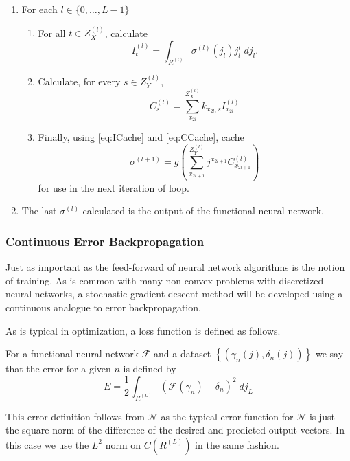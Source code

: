    \begin{enumerate}
    \item  For each $l \in \{0,\dots,L-1\}$
      \begin{enumerate}
      \item For all $t \in Z^{(l)}_X$, calculate
         \begin{equation} \label{eq:ICache} 
            I^{(l)}_t = \int_{R^{(l)}} \sigma^{(l)}(j_l)j_l^{t}\;dj_l.
         \end{equation}

       \item Calculate, for every $s \in Z^{(l)}_Y$,
         \begin{equation} \label{eq:CCache}
            C^{(l)}_{s} = \sum_{x_{2l}}^{Z^{(l)}_X} k_{x_{2l},s} I^{(l)}_{x_{2l}} 
         \end{equation}

        \item Finally, using \eqref{eq:ICache} and \eqref{eq:CCache}, cache 
          \begin{equation}
            \sigma^{(l+1)}=g\left(\sum_{x_{2l+1}}^{Z^{(l)}_Y} j^{x_{2l+1}} C^{(l)}_{x_{2l+1}}\right)
          \end{equation}
          for use in the next iteration of loop.
      \end{enumerate}
      \item The last $\sigma^{(l)}$ calculated is the output of the functional neural network.
    \end{enumerate}











\subsubsection{Continuous Error Backpropagation}

Just as important as the feed-forward of neural network algorithms is the notion of training. As is common with many non-convex problems with discretized neural networks, a stochastic gradient descent method will be developed using a continuous analogue to error backpropagation. 

As is typical in optimization, a loss function is defined as follows. 
\begin{definition}
    For a functional neural network $\mathcal{F}$ and a dataset $\left\{(\gamma_n(j), \delta_n(j))\right\}$ we say that the error for a given $n$ is defined by
    \begin{equation} \label{eq:error}
        E = \frac12 \int_{R^{(L)}}\left(\mathcal{F}(\gamma_n) - \delta_n \right)^2\;dj_L
    \end{equation}
\end{definition}
This error definition follows from $\mathcal{N}$ as the typical error function for $\mathcal{N}$ is just the square norm of the difference of the desired and predicted output vectors. In this case we use the $L^2$ norm on $C(R^{(L)})$ in the same fashion.

